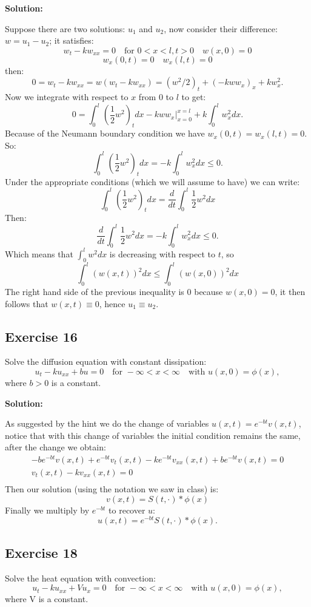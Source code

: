 \documentclass{article}
\begin{document}
\textbf{Solution:}

Suppose there are two solutions: $u_1$ and $u_2$, now consider their
difference: $w=u_1-u_2$; it satisfies:
\[
    w_t -kw_{xx}=0 \quad \text{for } 0<x<l,t>0 \quad w(x,0)=0
\]
\[
w_x(0,t)=0\quad w_x(l,t)=0
\]
then:
\[
0=w_t-kw_{xx}=w(w_t-kw_{xx})=(w^2/2)_t+(-kww_x)_x+kw_x^2.
\]
Now we integrate with respect to $x$ from 0 to $l$ to get:
\[
0=\int_0^l\left(\frac{1}{2}w^2\right)_tdx-kww_x\Big|_{x=0}^{x=l}+k\int_0^lw_x^2dx.
\]
Because of the Neumann boundary condition we have $w_x(0,t)=w_x(l,t)=0$. So:
\[
\int_0^l\left(\frac{1}{2}w^2\right)_tdx=-k\int_0^lw_x^2dx\leq 0.
\]
Under the appropriate conditions (which we will assume to have) we can write:
\[
\int_0^l\left(\frac{1}{2}w^2\right)_tdx=\frac{d}{dt}\int_0^l\frac{1}{2}w^2dx
\]
Then:
\[
\frac{d}{dt}\int_0^l\frac{1}{2}w^2dx=-k\int_0^lw_x^2dx\leq 0.
\]
Which means that $\int_0^lw^2dx$ is decreasing with respect to $t$, so
\[
\int_0^l(w(x,t))^2dx\leq\int_0^l(w(x,0))^2dx
\]
The right hand side of the previous inequality is 0 because $w(x,0)=0$, it then
follows that $w(x,t)\equiv 0$, hence $u_1\equiv u_2$.
\subsection{Exercise 16}
Solve the diffusion equation with constant dissipation:
\[
    u_t-ku_{xx}+bu=0\quad \text{for }-\infty<x<\infty \quad \text{with } u(x,0)=\phi(x),
\]
where $b>0$ is a constant.

\textbf{Solution:}

As suggested by the hint we do the change of variables $u(x,t)=e^{-bt}v(x,t)$,
notice that with this change of variables the initial condition remains the
same, after the change we obtain:
\begin{align*}
-be^{-bt}v(x,t)+e^{-bt}v_t(x,t)-ke^{-bt}v_{xx}(x,t)+be^{-bt}v(x,t)=0\\
v_t(x,t)-kv_{xx}(x,t)=0\\
\end{align*}
Then our solution (using the notation we saw in class) is:
\[
v(x,t)=S(t,\cdot)\ast \phi(x)
\]
Finally we multiply by $e^{-bt}$ to recover $u$:
\[
    u(x,t)=e^{-bt}S(t,\cdot)\ast \phi(x).
\]
\subsection{Exercise 18}
Solve the heat equation with convection:
\[
u_t-ku_{xx}+Vu_x=0\quad \text{for }-\infty<x<\infty \quad \text{with } u(x,0)=\phi(x),
\]
where V is a constant.
\end{document}

